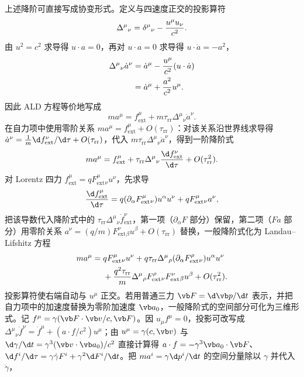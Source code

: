上述降阶可直接写成协变形式。定义与四速度正交的投影算符
\begin{equation*}
 \Delta^\mu{}_{\nu}
 =\delta^\mu{}_{\nu}-{u^\mu u_\nu\over c^2}.
\end{equation*}
由 $u^2=c^2$ 求导得 $u\cdot a=0$，再对 $u\cdot a=0$ 求导得 $u\cdot\dot a=-a^2$，
\begin{align*}
 \Delta^\mu{}_{\nu}\dot a^\nu
 &=\dot a^\mu-{u^\mu\over c^2}(u\cdot\dot a)\\
 &=\dot a^\mu+{a^2\over c^2}u^\mu.
\end{align*}
因此 ALD 方程等价地写成
\begin{equation*}
 ma^\mu=f_{\mathrm{ext}}^\mu
 +m\tau_{\mathrm{rr}}\Delta^\mu{}_{\nu}\dot a^\nu.
\end{equation*}
在自力项中使用零阶关系 $ma^\mu=f_{\mathrm{ext}}^\mu+O(\tau_{\mathrm{rr}})$：对该关系沿世界线求导得 $\dot a^\nu=\frac{1}{m}\d f_{\mathrm{ext}}^\nu/\d\tau+O(\tau_{\mathrm{rr}})$，代入 $m\tau_{\mathrm{rr}}\Delta^\mu{}_\nu\dot a^\nu$，得到一阶降阶式
\begin{equation*}
 ma^\mu=f_{\mathrm{ext}}^\mu
 +\tau_{\mathrm{rr}}\Delta^\mu{}_{\nu}
 {\d f_{\mathrm{ext}}^\nu\over\d\tau}
 +O(\tau_{\mathrm{rr}}^2).
\end{equation*}
对 Lorentz 四力 $f_{\mathrm{ext}}^\mu=qF_{\mathrm{ext}}^\mu{}_{\nu}u^\nu$，先求导
\begin{equation*}
 {\d f_{\mathrm{ext}}^\mu\over\d\tau}
 =q(\partial_\alpha F_{\mathrm{ext}}^\mu{}_{\nu})u^\alpha u^\nu
 +qF_{\mathrm{ext}}^\mu{}_{\nu}a^\nu,
\end{equation*}
把该导数代入降阶式中的 $\tau_{\mathrm{rr}}\Delta^\mu{}_\nu\dot f_{\mathrm{ext}}^\nu$，第一项（$\partial_\alpha F$ 部分）保留，第二项（$F a$ 部分）用零阶关系 $a^\nu=(q/m)F_{\mathrm{ext}}^\nu{}_{\beta}u^\beta+O(\tau_{\mathrm{rr}})$ 替换，一般降阶式化为 Landau--Lifshitz 方程
\begin{align*}
 ma^\mu={}&qF_{\mathrm{ext}}^\mu{}_{\nu}u^\nu
 +q\tau_{\mathrm{rr}}
 \Delta^\mu{}_{\rho}
 (\partial_\alpha F_{\mathrm{ext}}^\rho{}_{\nu})u^\alpha u^\nu\\
 &+{q^2\tau_{\mathrm{rr}}\over m}
 \Delta^\mu{}_{\rho}
 F_{\mathrm{ext}}^\rho{}_{\nu}
 F_{\mathrm{ext}}^\nu{}_{\beta}u^\beta
 +O(\tau_{\mathrm{rr}}^2).
\end{align*}
投影算符使右端自动与 $u^\mu$ 正交。若用普通三力 $\vb F=\d\vb p/\d t$ 表示，并把自力项中的加速度替换为零阶加速度 $\vb a_0$，一般降阶式的空间部分可化为三维形式。记 $f^\mu=\gamma(\vb F\cdot\vb v/c,\vb F)$。因 $u_\mu f^\mu=0$，投影可改写成 $\Delta^{\mu}{}_{\nu}\dot f^\nu=\dot f^\mu+(a\cdot f/c^2)u^\mu$；由 $u^\mu=\gamma(c,\vb v)$ 与 $\d\gamma/\d t=\gamma^3(\vb v\cdot\vb a_0)/c^2$ 直接计算得 $a\cdot f=-\gamma^3\vb a_0\cdot\vb F$、$\d f^i/\d\tau=\gamma\dot\gamma F^i+\gamma^2\d F^i/\d t$。把 $ma^i=\gamma\d p^i/\d t$ 的空间分量除以 $\gamma$ 并代入 $\dot\gamma$，
